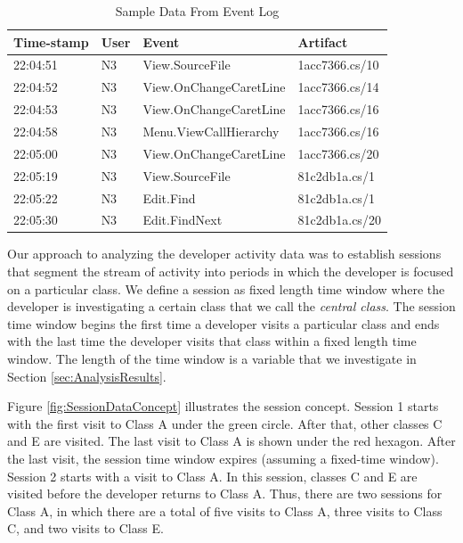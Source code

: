 \begin{table}[!t]
    \renewcommand{\arraystretch}{1.3}
    \centering
    \caption{Sample Data From Event Log}
    \begin{tabular}{llll}
        \toprule
        \textbf{Time-stamp} & \textbf{User} & \textbf{Event} & \textbf{Artifact} \\
        \midrule
        22:04:51 & N3 & View.SourceFile & 1acc7366.cs/10 \\
        22:04:52 & N3 & View.OnChangeCaretLine & 1acc7366.cs/14 \\
        22:04:53 & N3 & View.OnChangeCaretLine & 1acc7366.cs/16 \\
        22:04:58 & N3 & Menu.ViewCallHierarchy & 1acc7366.cs/16 \\
        22:05:00 & N3 & View.OnChangeCaretLine & 1acc7366.cs/20 \\
        22:05:19 & N3 & View.SourceFile & 81c2db1a.cs/1 \\
        22:05:22 & N3 & Edit.Find & 81c2db1a.cs/1 \\
        22:05:30 & N3 & Edit.FindNext & 81c2db1a.cs/20 \\
        \bottomrule
    \end{tabular}
    \label{fig:SampleEventData}
\end{table}

Our approach to analyzing the developer activity data was to establish sessions that segment the stream of activity into periods in which the developer is focused on a particular class. We define a session as fixed length time window where the developer is investigating a certain class that we call the \textit{central class}.  The session time window begins the first time a developer visits a particular class and ends with the last time the developer visits that class within a fixed length time window. The length of the time window is a variable that we investigate in Section \ref{sec:AnalysisResults}.  

Figure \ref{fig:SessionDataConcept} illustrates the session concept.  Session 1 starts with the first visit to Class A under the green circle.  After that, other classes C and E are visited. The last visit to Class A is shown under the red hexagon.  After the last visit, the session time window expires (assuming a fixed-time window).  Session 2 starts with a visit to Class A.  In this session, classes C and E are visited before the developer returns to Class A.  Thus, there are two sessions for Class A, in which there are a total of five visits to Class A, three visits to Class C, and two visits to Class E.

